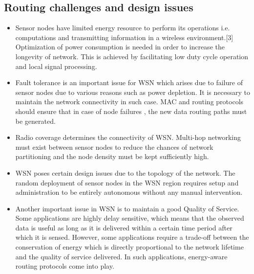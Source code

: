 \subsection{Routing challenges and design issues}
\begin{itemize}
    \item Sensor nodes have limited energy resource to perform its  operations i.e. computations and transmitting information in a wireless environment.[3] Optimization of power consumption is needed in order to increase the longevity of network. This is achieved by facilitating low duty cycle operation and local signal processing. \item Fault tolerance is an important issue for WSN which arises due to failure of sensor nodes due to various reasons such as power depletion. It is necessary to maintain the network connectivity in such case. MAC and routing protocols should ensure that in case of node failures , the new data routing paths must be generated. 
    \item Radio coverage determines the connectivity of WSN. Multi-hop networking must exist between sensor nodes to reduce the chances of network partitioning and the node density must be kept sufficiently high. 
    \item WSN poses certain design issues due to the topology of the network. The random deployment of sensor nodes in the WSN region requires setup and administration to be entirely autonomous without any manual intervention.
    \item Another important issue in WSN is to maintain a good Quality of Service. Some applications are highly delay sensitive, which means that the observed data is useful as long as it is delivered within a certain time period after which it is sensed. However, some applications require a trade-off between the conservation of energy which is directly proportional to the network lifetime and the quality of service delivered. In such applications, energy-aware routing protocols come into play.
\end{itemize}
